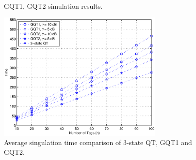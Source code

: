 \documentclass[conference]{IEEEtran}
\begin{document}
\begin{figure}
\centerline{
     \\
}
 \caption{GQT1, GQT2 simulation results.}
\label{}
\end{figure}

\begin{figure}
\centering
\includegraphics[width=3.25in]{fig7.eps}
\caption{Average singulation time comparison of 3-state QT, GQT1 and GQT2.  \label{fig:fig7}}
\end{figure}
\end{document}
